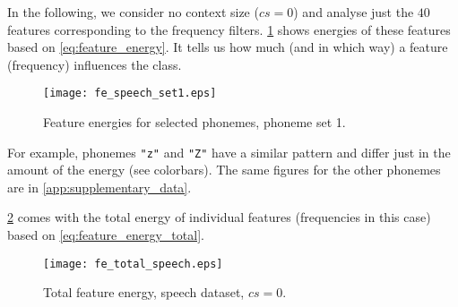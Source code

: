 In the following, we consider no context size ($ cs = 0 $) and analyse just the $ 40 $ features corresponding to the frequency filters. \cref{fig:examples:speech_fe_set1} shows energies of these features based on \cref{eq:feature_energy}. It tells us how much (and in which way) a feature (frequency) influences the class.

\begin{figure}[H]
\centering
\texttt{[image: fe\_speech\_set1.eps]}
\caption{Feature energies for selected phonemes, phoneme set 1.}
\label{fig:examples:speech_fe_set1}
\end{figure}

For example, phonemes \texttt{"z"} and \texttt{"Z"} have a similar pattern and differ just in the amount of the energy (see colorbars). The same figures for the other phonemes are in \cref{app:supplementary_data}.

\cref{fig:examples:speech_fe_total} comes with the total energy of individual features (frequencies in this case) based on \cref{eq:feature_energy_total}.
\begin{figure}[H]
\centering
\texttt{[image: fe\_total\_speech.eps]}
\caption{Total feature energy, speech dataset, $ cs = 0 $.}
\label{fig:examples:speech_fe_total}
\end{figure}